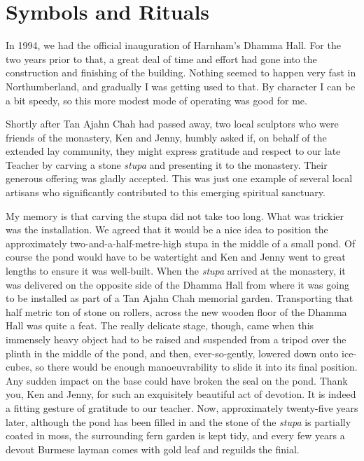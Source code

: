 \chapter{Symbols and Rituals}

In 1994, we had the official inauguration of Harnham's Dhamma Hall. For
the two years prior to that, a great deal of time and effort had gone
into the construction and finishing of the building. Nothing seemed to
happen very fast in Northumberland, and gradually I was getting used to
that. By character I can be a bit speedy, so this more modest mode of
operating was good for me.

Shortly after Tan Ajahn Chah had passed away, two local sculptors who
were friends of the monastery, Ken and Jenny, humbly asked if, on behalf
of the extended lay community, they might express gratitude and respect
to our late Teacher by carving a stone \emph{stupa} and presenting it to
the monastery. Their generous offering was gladly accepted. This was
just one example of several local artisans who significantly contributed
to this emerging spiritual sanctuary.

My memory is that carving the stupa did not take too long. What was
trickier was the installation. We agreed that it would be a nice idea to
position the approximately two-and-a-half-metre-high stupa in the middle
of a small pond. Of course the pond would have to be watertight and Ken
and Jenny went to great lengths to ensure it was well-built. When the
\emph{stupa} arrived at the monastery, it was delivered on the opposite
side of the Dhamma Hall from where it was going to be installed as part
of a Tan Ajahn Chah memorial garden. Transporting that half metric ton
of stone on rollers, across the new wooden floor of the Dhamma Hall was
quite a feat. The really delicate stage, though, came when this
immensely heavy object had to be raised and suspended from a tripod over
the plinth in the middle of the pond, and then, ever-so-gently, lowered
down onto ice-cubes, so there would be enough manoeuvrability to slide
it into its final position. Any sudden impact on the base could have
broken the seal on the pond. Thank you, Ken and Jenny, for such an
exquisitely beautiful act of devotion. It is indeed a fitting gesture of
gratitude to our teacher. Now, approximately twenty-five years later,
although the pond has been filled in and the stone of the \emph{stupa}
is partially coated in moss, the surrounding fern garden is kept tidy,
and every few years a devout Burmese layman comes with gold leaf and
reguilds the finial.

